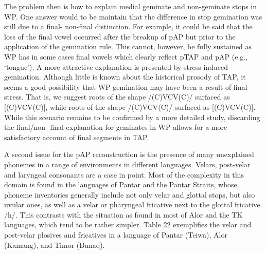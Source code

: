 The problem then is how to explain medial geminate and non-geminate stops in WP. One answer would to be maintain that the difference in stop gemination was still due to a final- non-final distinction. For example, it could be said that the loss of the final vowel occurred after the breakup of pAP but prior to the application of the gemination rule. This cannot, however, be fully sustained as WP has in some cases final vowels which clearly reflect pTAP and pAP (e.g., `tongue'). A more attractive explanation is presented by stress-induced gemination. Although little is known about the historical prosody of TAP, it seems a good possibility that WP gemination may have been a result of final stress. That is, we suggest roots of the shape /(C)V{\textprimstress}CV(C)/ surfaced as [(C)V{\textprimstress}C{\textlengthmark}V(C)], while roots of the shape /{\textprimstress}(C)VCV(C)/ surfaced as [{\textprimstress}(C)VCV(C)]. While this scenario remains to be confirmed by a more detailed study, discarding the final/non-
final explanation for geminates in WP allows for a more satisfactory account of final segments in TAP.

A second issue for the pAP reconstruction is the presence of many unexplained phonemes in a range of environments in different languages. Velars, post-velar and laryngeal consonants are a case in point. Most of the complexity in this domain is found in the languages of Pantar and the Pantar Straits, whose phoneme inventories generally include not only velar and glottal stops, but also uvular ones, as well as a velar or pharyngeal fricative next to the glottal fricative /h/. This contrasts with the situation as found in most of Alor and the TK languages, which tend to be rather simpler. Table 22 exemplifies the velar and post-velar plosives and fricatives in a language of Pantar (Teiwa), Alor (Kamang), and Timor (Bunaq).


